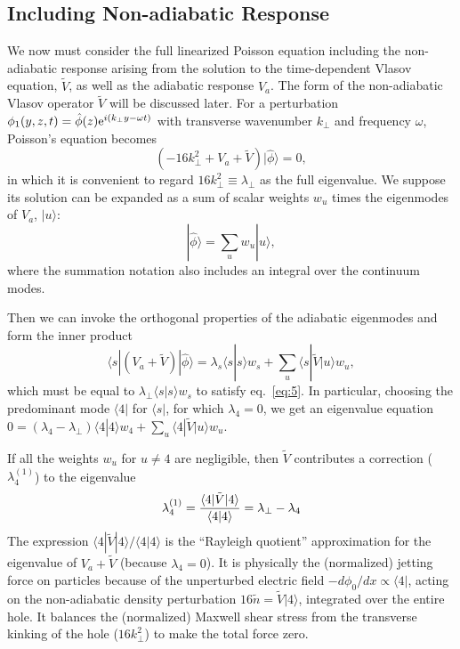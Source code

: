 \documentclass[12pt]{article}
\def\ket#1{|#1\rangle}
\def\bra#1{\langle#1}
\begin{document}
\subsection{Including Non-adiabatic Response}
We now must consider the full linearized Poisson equation including the
non-adiabatic response arising from the solution to the time-dependent
Vlasov equation, $\tilde{V}$, as well as the adiabatic response
$V_a$. The form of the non-adiabatic Vlasov operator $\tilde{V}$ will
be discussed later. For a perturbation
$\phi_1(y,z,t)=\hat\phi(z){\rm e}^{i(k_\perp y-\omega t)}$ with
transverse wavenumber $k_\perp$ and frequency $\omega$, Poisson's
equation becomes
\begin{equation}
  \label{eq:5}
  (-16k_\perp^2+V_a+\tilde{V})\ket{\hat\phi}=0,
\end{equation}
in which it is convenient to regard $16k_\perp^2\equiv\lambda_\perp$ as the
full eigenvalue. 
We suppose its solution can be expanded as a sum of scalar
weights $w_u$ times the eigenmodes of $V_a$, $\ket{u}$:
\begin{equation}
  \label{eq:6}
  \ket{\hat\phi}=\sum_u w_u \ket{u},
\end{equation}
where the summation notation also includes an integral over the
continuum modes.

Then we can invoke the orthogonal properties of the
adiabatic eigenmodes and form the inner product
\begin{equation}
  \label{eq:7}
  \bra{s}|(%
  V_a+\tilde{V})\ket{\hat\phi}
  = %
  \lambda_s\bra{s}\ket{s}w_s+\sum_u\bra{s}|\tilde{V}\ket{u}w_u,
\end{equation}
which must be equal to $\lambda_\perp\bra{s}\ket{s}w_s$ to satisfy eq.\ \ref{eq:5}.
In particular, choosing the predominant mode $\bra{4}|$ for
$\bra{s}|$, for which $\lambda_4=0$, we get an eigenvalue equation
$0=(\lambda_4-\lambda_\perp)\bra{4}\ket{4}w_4+\sum_u\bra{4}|\tilde{V}\ket{u}w_u$.

If all the weights $w_u$ for $u\not=4$ are negligible, then
$\tilde{V}$ contributes a correction ($\lambda_{4}^{(1)}$) to the eigenvalue
\begin{equation}
  \label{eq:8}
  \lambda_{4}^{(1)}= {\bra{4}|\tilde{V}\ket{4}\over\bra{4}\ket{4}}=\lambda_\perp-\lambda_4
\end{equation}
The expression $\bra{4}|\tilde{V}\ket{4}/\bra{4}\ket{4}$ is the ``Rayleigh
quotient'' approximation for the eigenvalue of $V_a+\tilde{V}$
(because $\lambda_4=0$). It is
physically the (normalized) jetting force on particles because of the
unperturbed electric field $-d\phi_0/dx\propto\bra{4}|$, acting on the
non-adiabatic density perturbation $16 \tilde n = \tilde{V}\ket{4}$, integrated
over the entire hole. It balances the (normalized) Maxwell shear
stress from the transverse kinking of the hole ($16k_\perp^2$) to
make the total force zero.
\end{document}
